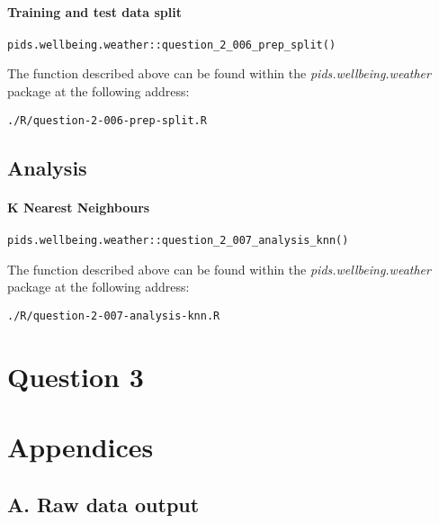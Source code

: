 \documentclass[12pt, oneside, openany]{book}
\begin{document}
\subsubsection*{Training and test data split}

\begin{verbatim}
pids.wellbeing.weather::question_2_006_prep_split()
\end{verbatim}

The function described above can be found within the \emph{pids.wellbeing.weather} package at the following address:

\begin{verbatim}
./R/question-2-006-prep-split.R
\end{verbatim}

\section*{Analysis}

\subsubsection*{K Nearest Neighbours}


\begin{verbatim}
pids.wellbeing.weather::question_2_007_analysis_knn()
\end{verbatim}

The function described above can be found within the \emph{pids.wellbeing.weather} package at the following address:

\begin{verbatim}
./R/question-2-007-analysis-knn.R
\end{verbatim}

\setcounter{equation}{0}
\chapter*{Question 3}

\pagebreak
 


\chapter*{Appendices}
\newpage

\section*{A. Raw data output}
\label{appendix:raw-data-output}

\backmatter
\end{document}
